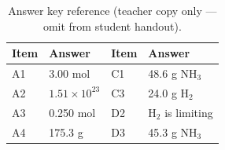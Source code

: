 \begin{table}[H]
\centering
\small
\caption{Answer key reference (teacher copy only --- omit from student handout).}
\begin{tabular}{@{}llll@{}}
\toprule
\textbf{Item} & \textbf{Answer} & \textbf{Item} & \textbf{Answer} \\
\midrule
A1 & 3.00 mol & C1 & 48.6 g $\mathrm{NH_3}$ \\
A2 & $1.51\times10^{23}$ & C3 & 24.0 g $\mathrm{H_2}$ \\
A3 & 0.250 mol & D2 & $\mathrm{H_2}$ is limiting \\
A4 & 175.3 g & D3 & 45.3 g $\mathrm{NH_3}$ \\
\bottomrule
\end{tabular}
\end{table}
